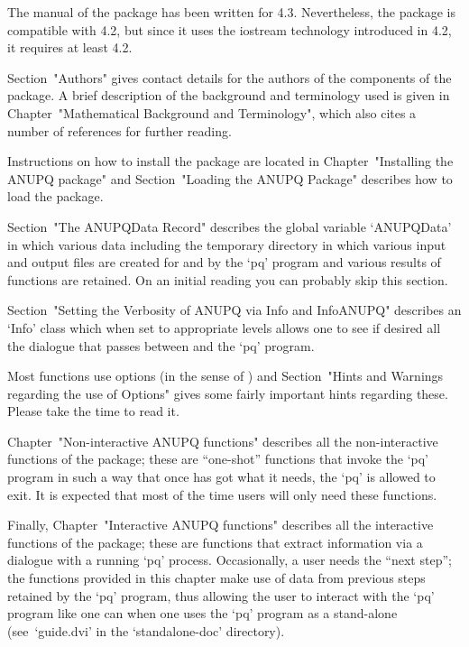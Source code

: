 \endlist


The manual of the {\ANUPQ} package  has  been  written  for  {\GAP}  4.3.
Nevertheless, the {\ANUPQ} package is compatible  with  {\GAP}  4.2,  but
since it uses the  iostream  technology  introduced  in  {\GAP}  4.2,  it
requires at least {\GAP} 4.2.

Section~"Authors" gives contact details for the authors of the components
of the {\ANUPQ} package.  A  brief  description  of  the  background  and
terminology  used  is  given  in  Chapter~"Mathematical  Background   and
Terminology", which  also  cites  a  number  of  references  for  further
reading.

Instructions on how to  install  the  {\ANUPQ}  package  are  located  in
Chapter~"Installing the ANUPQ package"  and  Section~"Loading  the  ANUPQ
Package" describes how to load the {\ANUPQ} package.

Section~"The ANUPQData Record" describes the global variable  `ANUPQData'
in which various data including the temporary directory in which  various
input and output files are created  for  and  by  the  `pq'  program  and
various results of functions are retained. On an initial reading you  can
probably skip this section.

Section~"Setting the Verbosity of ANUPQ via Info and InfoANUPQ" describes
an `Info' class which when set to appropriate levels allows one to see if
desired all the dialogue that passes between {\GAP} and the `pq' program.

Most {\ANUPQ}  functions  use  options  (in  the  sense  of  {\GAP})  and
Section~"Hints and Warnings regarding the  use  of  Options"  gives  some
fairly important hints regarding these. Please take the time to read it.

Chapter~"Non-interactive   ANUPQ    functions"    describes    all    the
non-interactive functions of the {\ANUPQ} package; these are ``one-shot''
functions that invoke the `pq' program in such a way that once {\GAP} has
got what it needs, the `pq' is allowed to exit. It is expected that  most
of the time users will only need these functions.

Finally,  Chapter~"Interactive  ANUPQ  functions"   describes   all   the
interactive functions of the {\ANUPQ} package; these are  functions  that
extract  information  via  a  dialogue  with  a  running  `pq'   process.
Occasionally, a user needs the ``next step''; the functions  provided  in
this chapter make use of data from previous steps retained  by  the  `pq'
program, thus allowing the user to interact with the  `pq'  program  like
one can when one uses the `pq' program as a stand-alone  (see~`guide.dvi'
in the `standalone-doc' directory).

